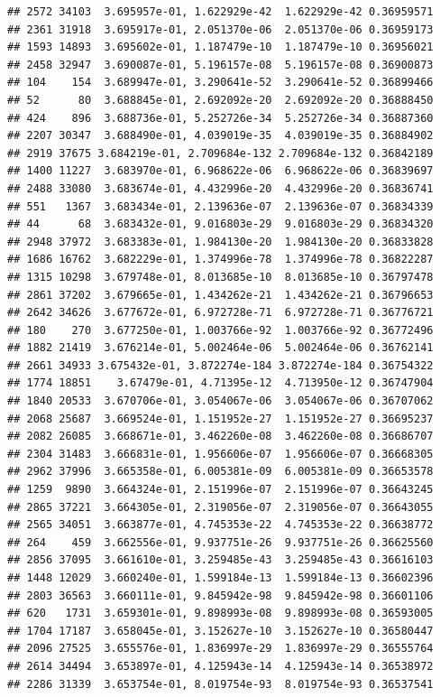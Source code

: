 \documentclass[
]{article}
\begin{document}
\begin{verbatim}
## 2572 34103  3.695957e-01, 1.622929e-42  1.622929e-42 0.36959571
## 2361 31918  3.695917e-01, 2.051370e-06  2.051370e-06 0.36959173
## 1593 14893  3.695602e-01, 1.187479e-10  1.187479e-10 0.36956021
## 2458 32947  3.690087e-01, 5.196157e-08  5.196157e-08 0.36900873
## 104    154  3.689947e-01, 3.290641e-52  3.290641e-52 0.36899466
## 52      80  3.688845e-01, 2.692092e-20  2.692092e-20 0.36888450
## 424    896  3.688736e-01, 5.252726e-34  5.252726e-34 0.36887360
## 2207 30347  3.688490e-01, 4.039019e-35  4.039019e-35 0.36884902
## 2919 37675 3.684219e-01, 2.709684e-132 2.709684e-132 0.36842189
## 1400 11227  3.683970e-01, 6.968622e-06  6.968622e-06 0.36839697
## 2488 33080  3.683674e-01, 4.432996e-20  4.432996e-20 0.36836741
## 551   1367  3.683434e-01, 2.139636e-07  2.139636e-07 0.36834339
## 44      68  3.683432e-01, 9.016803e-29  9.016803e-29 0.36834320
## 2948 37972  3.683383e-01, 1.984130e-20  1.984130e-20 0.36833828
## 1686 16762  3.682229e-01, 1.374996e-78  1.374996e-78 0.36822287
## 1315 10298  3.679748e-01, 8.013685e-10  8.013685e-10 0.36797478
## 2861 37202  3.679665e-01, 1.434262e-21  1.434262e-21 0.36796653
## 2642 34626  3.677672e-01, 6.972728e-71  6.972728e-71 0.36776721
## 180    270  3.677250e-01, 1.003766e-92  1.003766e-92 0.36772496
## 1882 21419  3.676214e-01, 5.002464e-06  5.002464e-06 0.36762141
## 2661 34933 3.675432e-01, 3.872274e-184 3.872274e-184 0.36754322
## 1774 18851    3.67479e-01, 4.71395e-12  4.713950e-12 0.36747904
## 1840 20533  3.670706e-01, 3.054067e-06  3.054067e-06 0.36707062
## 2068 25687  3.669524e-01, 1.151952e-27  1.151952e-27 0.36695237
## 2082 26085  3.668671e-01, 3.462260e-08  3.462260e-08 0.36686707
## 2304 31483  3.666831e-01, 1.956606e-07  1.956606e-07 0.36668305
## 2962 37996  3.665358e-01, 6.005381e-09  6.005381e-09 0.36653578
## 1259  9890  3.664324e-01, 2.151996e-07  2.151996e-07 0.36643245
## 2865 37221  3.664305e-01, 2.319056e-07  2.319056e-07 0.36643055
## 2565 34051  3.663877e-01, 4.745353e-22  4.745353e-22 0.36638772
## 264    459  3.662556e-01, 9.937751e-26  9.937751e-26 0.36625560
## 2856 37095  3.661610e-01, 3.259485e-43  3.259485e-43 0.36616103
## 1448 12029  3.660240e-01, 1.599184e-13  1.599184e-13 0.36602396
## 2803 36563  3.660111e-01, 9.845942e-98  9.845942e-98 0.36601106
## 620   1731  3.659301e-01, 9.898993e-08  9.898993e-08 0.36593005
## 1704 17187  3.658045e-01, 3.152627e-10  3.152627e-10 0.36580447
## 2096 27525  3.655576e-01, 1.836997e-29  1.836997e-29 0.36555764
## 2614 34494  3.653897e-01, 4.125943e-14  4.125943e-14 0.36538972
## 2286 31339  3.653754e-01, 8.019754e-93  8.019754e-93 0.36537541

\end{verbatim}
\end{document}
